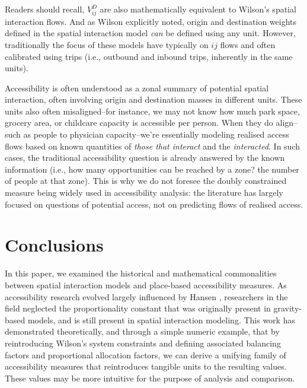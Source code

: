 \documentclass[
  10pt,
  letterpaper,
]{article}
\begin{document}
Readers should recall, \(V_{ij}^D\) are also mathematically equivalent
to Wilson's spatial interaction flows. And as Wilson \citep{wilson1971}
explicitly noted, origin and destination weights defined in the spatial
interaction model \emph{can} be defined using any unit. However,
traditionally the focus of these models have typically on \(ij\) flows
and often calibrated using trips (i.e., outbound and inbound trips,
inherently in the same units).

Accessibility is often understood as a zonal summary of potential
spatial interaction, often involving origin and destination masses in
different units. These units also often misaligned--for instance, we may
not know how much park space, grocery area, or childcare capacity is
accessible per person. When they do align--such as people to physician
capacity--we're essentially modeling realised access flows based on
known quantities of \emph{those that interact} and the
\emph{interacted}. In such cases, the traditional accessibility question
is already answered by the known information (i.e., how many
opportunities can be reached by a zone? the number of people at that
zone). This is why we do not foresee the doubly constrained measure
being widely used in accessibility analysis: the literature has largely
focused on questions of potential access, not on predicting flows of
realised access.

\section{Conclusions}\label{conclusions}

In this paper, we examined the historical and mathematical commonalities
between spatial interaction models and place-based accessibility
measures. As accessibility research evolved largely influenced by Hansen
\citep{hansen1959}, researchers in the field neglected the
proportionality constant that was originally present in gravity-based
models, and is still present in spatial interaction modeling. This work
has demonstrated theoretically, and through a simple numeric example,
that by reintroducing Wilson's system constraints and defining
associated balancing factors and proportional allocation factors, we can
derive a unifying family of accessibility measures that reintroduces
tangible units to the resulting values. These values may be more
intuitive for the purpose of analysis and comparison.
\end{document}
